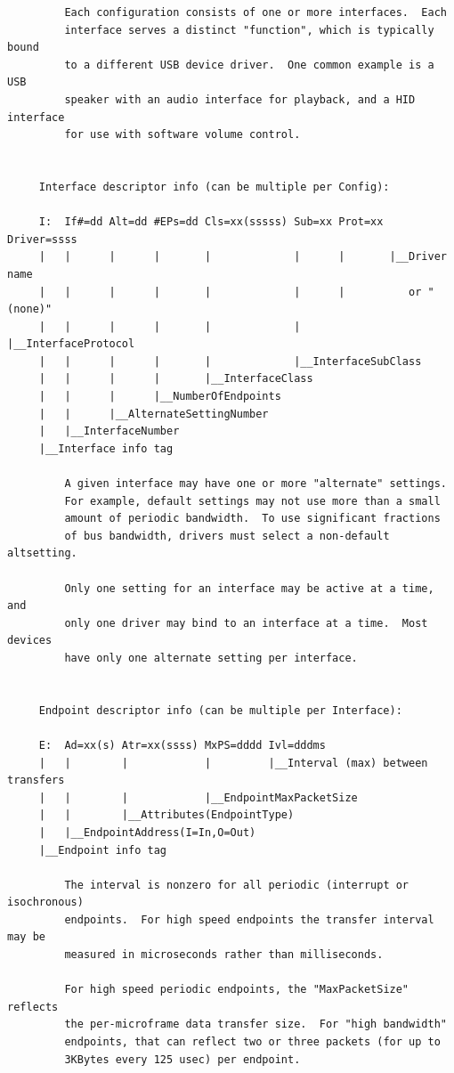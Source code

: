 {{{{{{{{{{{{{{{{{\begin{verbatim}
         Each configuration consists of one or more interfaces.  Each
         interface serves a distinct "function", which is typically bound
         to a different USB device driver.  One common example is a USB
         speaker with an audio interface for playback, and a HID interface
         for use with software volume control.
     
     
     Interface descriptor info (can be multiple per Config):
     
     I:  If#=dd Alt=dd #EPs=dd Cls=xx(sssss) Sub=xx Prot=xx Driver=ssss
     |   |      |      |       |             |      |       |__Driver name
     |   |      |      |       |             |      |          or "(none)"
     |   |      |      |       |             |      |__InterfaceProtocol
     |   |      |      |       |             |__InterfaceSubClass
     |   |      |      |       |__InterfaceClass
     |   |      |      |__NumberOfEndpoints
     |   |      |__AlternateSettingNumber
     |   |__InterfaceNumber
     |__Interface info tag
     
         A given interface may have one or more "alternate" settings.
         For example, default settings may not use more than a small
         amount of periodic bandwidth.  To use significant fractions
         of bus bandwidth, drivers must select a non-default altsetting.
     
         Only one setting for an interface may be active at a time, and
         only one driver may bind to an interface at a time.  Most devices
         have only one alternate setting per interface.
     
     
     Endpoint descriptor info (can be multiple per Interface):
     
     E:  Ad=xx(s) Atr=xx(ssss) MxPS=dddd Ivl=dddms
     |   |        |            |         |__Interval (max) between transfers
     |   |        |            |__EndpointMaxPacketSize
     |   |        |__Attributes(EndpointType)
     |   |__EndpointAddress(I=In,O=Out)
     |__Endpoint info tag
     
         The interval is nonzero for all periodic (interrupt or isochronous)
         endpoints.  For high speed endpoints the transfer interval may be
         measured in microseconds rather than milliseconds.
     
         For high speed periodic endpoints, the "MaxPacketSize" reflects
         the per-microframe data transfer size.  For "high bandwidth"
         endpoints, that can reflect two or three packets (for up to
         3KBytes every 125 usec) per endpoint.
     

\end{verbatim}}}}}}}}}}}}}}}}}}
